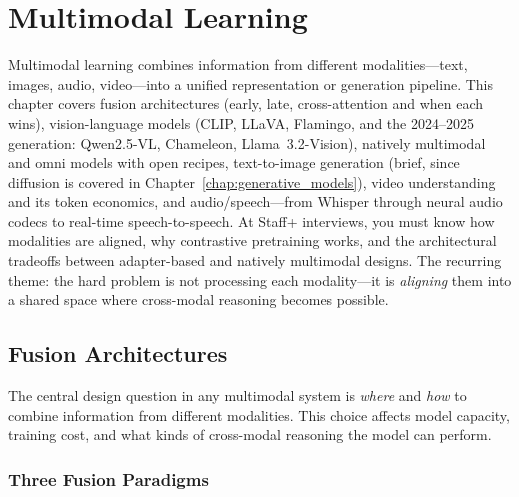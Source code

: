 \chapter{Multimodal Learning}
\label{chap:multimodal_learning}

\begin{tldr}
Multimodal learning combines information from different modalities---text, images, audio, video---into a unified representation or generation pipeline. This chapter covers fusion architectures (early, late, cross-attention and when each wins), vision-language models (CLIP, LLaVA, Flamingo, and the 2024--2025 generation: Qwen2.5-VL, Chameleon, Llama~3.2-Vision), natively multimodal and omni models with open recipes, text-to-image generation (brief, since diffusion is covered in Chapter~\ref{chap:generative_models}), video understanding and its token economics, and audio/speech---from Whisper through neural audio codecs to real-time speech-to-speech. At Staff+ interviews, you must know how modalities are aligned, why contrastive pretraining works, and the architectural tradeoffs between adapter-based and natively multimodal designs. The recurring theme: the hard problem is not processing each modality---it is \textit{aligning} them into a shared space where cross-modal reasoning becomes possible.
\end{tldr}

\section{Fusion Architectures}
\label{sec:fusion_architectures}

The central design question in any multimodal system is \textit{where} and \textit{how} to combine information from different modalities. This choice affects model capacity, training cost, and what kinds of cross-modal reasoning the model can perform.

\subsection{Three Fusion Paradigms}

